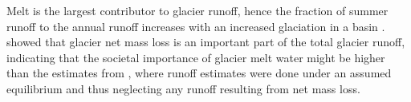 \documentclass[12pt, a4paper]{article}
\begin{document}
Melt is the largest contributor to glacier runoff, hence the fraction of summer
runoff to the annual runoff increases with an increased glaciation in a basin
\parencite{zappaSeasonalWaterBalance2003,chenInfluenceAlpineGlaciers1990}.
\textcite{blissGlobalResponseGlacier2014} showed that glacier net
mass loss is an important part of the total glacier runoff, indicating that the
societal importance of glacier melt water might be higher than the estimates
from \textcite{kaserContributionPotentialGlaciers2010}, where runoff estimates
were done under an assumed equilibrium and thus neglecting any runoff resulting
from net mass loss.


\end{document}
